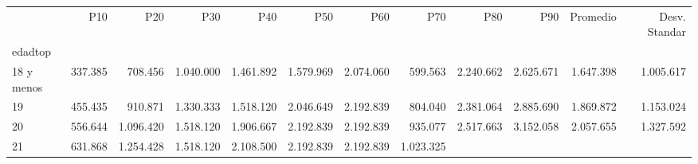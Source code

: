 \begin{tabular}{llllllllllll}
\cline{1-12}
\multicolumn{1}{c}{} &
  \multicolumn{1}{|r}{P10} &
  \multicolumn{1}{r}{P20} &
  \multicolumn{1}{r}{P30} &
  \multicolumn{1}{r}{P40} &
  \multicolumn{1}{r}{P50} &
  \multicolumn{1}{r}{P60} &
  \multicolumn{1}{r}{P70} &
  \multicolumn{1}{r}{P80} &
  \multicolumn{1}{r}{P90} &
  \multicolumn{1}{r}{Promedio} &
  \multicolumn{1}{r}{Desv. Standar} \\
\cline{1-12}
\multicolumn{1}{l}{edadtop} &
  \multicolumn{1}{|r}{} &
  \multicolumn{1}{r}{} &
  \multicolumn{1}{r}{} &
  \multicolumn{1}{r}{} &
  \multicolumn{1}{r}{} &
  \multicolumn{1}{r}{} &
  \multicolumn{1}{r}{} &
  \multicolumn{1}{r}{} &
  \multicolumn{1}{r}{} &
  \multicolumn{1}{r}{} &
  \multicolumn{1}{r}{} \\
\multicolumn{1}{l}{\hspace{1em}18 y menos} &
  \multicolumn{1}{|r}{337.385} &
  \multicolumn{1}{r}{708.456} &
  \multicolumn{1}{r}{1.040.000} &
  \multicolumn{1}{r}{1.461.892} &
  \multicolumn{1}{r}{1.579.969} &
  \multicolumn{1}{r}{2.074.060} &
  \multicolumn{1}{r}{599.563} &
  \multicolumn{1}{r}{2.240.662} &
  \multicolumn{1}{r}{2.625.671} &
  \multicolumn{1}{r}{1.647.398} &
  \multicolumn{1}{r}{1.005.617} \\
\multicolumn{1}{l}{\hspace{1em}19} &
  \multicolumn{1}{|r}{455.435} &
  \multicolumn{1}{r}{910.871} &
  \multicolumn{1}{r}{1.330.333} &
  \multicolumn{1}{r}{1.518.120} &
  \multicolumn{1}{r}{2.046.649} &
  \multicolumn{1}{r}{2.192.839} &
  \multicolumn{1}{r}{804.040} &
  \multicolumn{1}{r}{2.381.064} &
  \multicolumn{1}{r}{2.885.690} &
  \multicolumn{1}{r}{1.869.872} &
  \multicolumn{1}{r}{1.153.024} \\
\multicolumn{1}{l}{\hspace{1em}20} &
  \multicolumn{1}{|r}{556.644} &
  \multicolumn{1}{r}{1.096.420} &
  \multicolumn{1}{r}{1.518.120} &
  \multicolumn{1}{r}{1.906.667} &
  \multicolumn{1}{r}{2.192.839} &
  \multicolumn{1}{r}{2.192.839} &
  \multicolumn{1}{r}{935.077} &
  \multicolumn{1}{r}{2.517.663} &
  \multicolumn{1}{r}{3.152.058} &
  \multicolumn{1}{r}{2.057.655} &
  \multicolumn{1}{r}{1.327.592} \\
\multicolumn{1}{l}{\hspace{1em}21} &
  \multicolumn{1}{|r}{631.868} &
  \multicolumn{1}{r}{1.254.428} &
  \multicolumn{1}{r}{1.518.120} &
  \multicolumn{1}{r}{2.108.500} &
  \multicolumn{1}{r}{2.192.839} &
  \multicolumn{1}{r}{2.192.839} &
  \multicolumn{1}{r}{1.023.325} &

\end{tabular}
